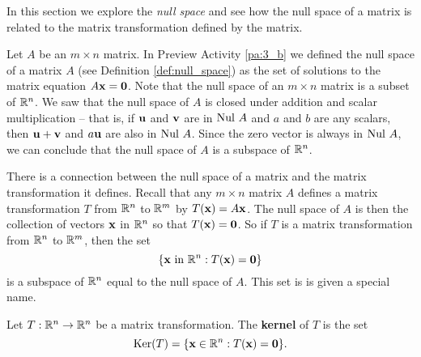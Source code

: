 \label{sec:null_kernel}

In this section we explore the \emph{null space} and see how the null space of a matrix is related to the matrix transformation defined by the matrix. 


Let $A$ be an $m \times n$ matrix. In Preview Activity \ref{pa:3_b} we defined the null space of a matrix $A$ (see Definition \ref{def:null_space}) as the set of solutions to the matrix equation $A \mathbf{x} = \mathbf{0}$. Note that the null space of an $m \times n$ matrix is a subset of $\mathbb{R}^n$. We saw that the null space of $A$ is closed under addition and scalar multiplication -- that is, if $\mathbf{u}$ and $\mathbf{v}$ are in $\text{Nul } A$ and $a$ and $b$ are any scalars, then $\mathbf{u} + \mathbf{v}$ and $a \mathbf{u}$ are also in $\text{Nul } A$. Since the zero vector is always in $\text{Nul } A$, we can conclude that the null space of $A$ is a subspace of $\mathbb{R}^n$. 



There is a connection between the null space of a matrix and the matrix transformation it defines. Recall that any $m \times n$ matrix $A$ defines a matrix transformation $T$ from $\mathbb{R}^n$ to $\mathbb{R}^m$ by $T(\mathbf{x}) = A \mathbf{x}$. The null space of $A$ is then the collection of vectors $\mathbf{x}$ in $\mathbb{R}^n$ so that $T(\mathbf{x}) = \mathbf{0}$. So if $T$ is a matrix transformation from $\mathbb{R}^n$ to $\mathbb{R}^m$, then the set 
\[\{\mathbf{x} \text{ in } \mathbb{R}^n : T(\mathbf{x}) = \mathbf{0}\}\]
 is a subspace of $\mathbb{R}^n$ equal to the null space of $A$. This set is is given a special name. 



\begin{definition} Let $T : \mathbb{R}^n \to \mathbb{R}^n$ be a matrix transformation. The \textbf{kernel} of $T$ is the set
\[\text{Ker}(T) = \{\mathbf{x} \in \mathbb{R}^n : T(\mathbf{x}) = \mathbf{0}\}.\]
\end{definition}


